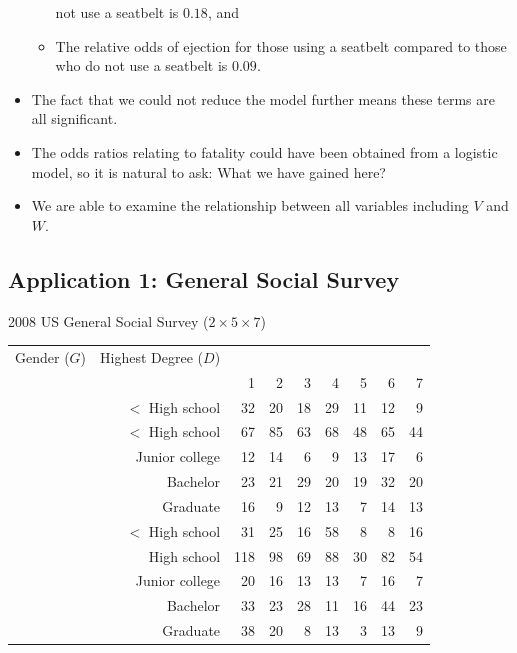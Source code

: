 \documentclass{article}\usepackage[]{graphicx}\usepackage[svgnames]{xcolor}
\begin{document}
\begin{itemize}
\begin{itemize}
                    not use a seatbelt is $0.18$, and
              \item The relative odds of ejection for those using a seatbelt compared to those who do
                    not use a seatbelt is $0.09$.
          \end{itemize}
    \item The fact that we could not reduce the model further means these terms are all
          significant.
    \item The odds ratios relating to fatality could have been obtained from a logistic model,
          so it is natural to ask: What we have gained here?
    \item We are able to examine the relationship between all variables including $V$ and $W$.
\end{itemize}
\subsection*{Application 1: General Social Survey}
\begin{Example}{2008 US General Social Survey ($ 2\times 5\times 7 $)}
    \begin{center}
        \begin{NiceTabular}{crrrrrrrr}
            Gender ($ G $)     & Highest Degree ($ D $) &  \\
            &                        & 1  & 2  & 3  & 4  & 5  & 6  & 7 \\
            \midrule
               &
            $<$ High school      & 32                     & 20 & 18 & 29 & 11 & 12 & 9      \\
            &$<$ High school      & 67                     & 85 & 63 & 68 & 48 & 65 & 44     \\
            &Junior college       & 12                     & 14 & 6  & 9  & 13 & 17 & 6      \\
            &Bachelor             & 23                     & 21 & 29 & 20 & 19 & 32 & 20     \\
            &Graduate             & 16                     & 9  & 12 & 13 & 7  & 14 & 13     \\
            \midrule
             &
            $<$ High school      & 31                     & 25 & 16 & 58 & 8  & 8  & 16     \\
            &High school          & 118                    & 98 & 69 & 88 & 30 & 82 & 54     \\
            &Junior college       & 20                     & 16 & 13 & 13 & 7  & 16 & 7      \\
            &Bachelor             & 33                     & 23 & 28 & 11 & 16 & 44 & 23     \\
            &Graduate             & 38                     & 20 & 8  & 13 & 3  & 13 & 9      \\
            \bottomrule
        \end{NiceTabular}
    \end{center}
\end{Example}
\end{document}
